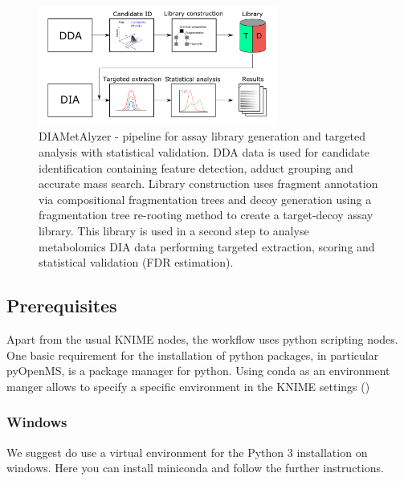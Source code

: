 \begin{figure}[!t]
  \centering
  \includegraphics[width=0.7\textwidth]{graphics/openswathmetabo/pipeline_overview.png}
  \caption{DIAMetAlyzer - pipeline for assay library generation and targeted analysis with statistical validation. DDA data is used for candidate identification containing feature detection, adduct grouping and accurate mass search. Library construction uses fragment annotation via compositional fragmentation trees and decoy generation using a fragmentation tree re-rooting method to create a target-decoy assay library. This library is used in a second step to analyse metabolomics DIA data performing targeted extraction, scoring and statistical validation (FDR estimation).}
  \label{fig:pipline_overview}
\end{figure}

\subsection{Prerequisites}
Apart from the usual KNIME nodes, the workflow uses python scripting nodes. One basic requirement for the installation of python packages, in particular pyOpenMS, is a package manager for python. Using conda as an environment manger allows to specify a specific environment in the KNIME settings ()

\subsubsection{Windows}
We suggest do use a virtual environment for the Python 3 installation on windows. 
Here you can install miniconda and follow the further instructions. \\

